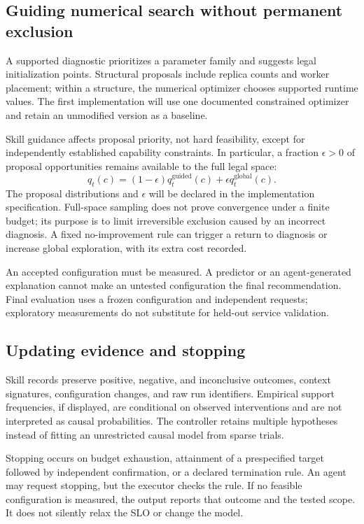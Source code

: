 \documentclass[11pt,a4paper]{article}
\begin{document}
\subsection{Guiding numerical search without permanent exclusion}
A supported diagnostic prioritizes a parameter family and suggests legal initialization points. Structural proposals include replica counts and worker placement; within a structure, the numerical optimizer chooses supported runtime values. The first implementation will use one documented constrained optimizer and retain an unmodified version as a baseline.

Skill guidance affects proposal priority, not hard feasibility, except for independently established capability constraints. In particular, a fraction $\epsilon>0$ of proposal opportunities remains available to the full legal space:
\begin{equation}
 q_t(c)=(1-\epsilon)q_t^{\mathrm{guided}}(c)
                 +\epsilon q_t^{\mathrm{global}}(c).
\end{equation}
The proposal distributions and $\epsilon$ will be declared in the implementation specification. Full-space sampling does not prove convergence under a finite budget; its purpose is to limit irreversible exclusion caused by an incorrect diagnosis. A fixed no-improvement rule can trigger a return to diagnosis or increase global exploration, with its extra cost recorded.

An accepted configuration must be measured. A predictor or an agent-generated explanation cannot make an untested configuration the final recommendation. Final evaluation uses a frozen configuration and independent requests; exploratory measurements do not substitute for held-out service validation.

\subsection{Updating evidence and stopping}
Skill records preserve positive, negative, and inconclusive outcomes, context signatures, configuration changes, and raw run identifiers. Empirical support frequencies, if displayed, are conditional on observed interventions and are not interpreted as causal probabilities. The controller retains multiple hypotheses instead of fitting an unrestricted causal model from sparse trials.

Stopping occurs on budget exhaustion, attainment of a prespecified target followed by independent confirmation, or a declared termination rule. An agent may request stopping, but the executor checks the rule. If no feasible configuration is measured, the output reports that outcome and the tested scope. It does not silently relax the SLO or change the model.
\end{document}

